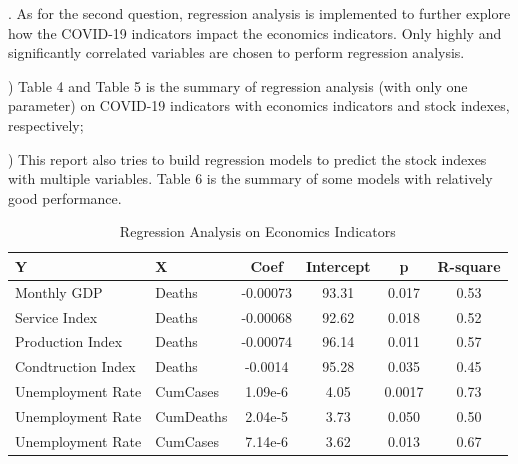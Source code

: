 \documentclass[12pt, a4paper]{report}
\begin{document}
\hspace*{\fill}

. As for the second question, regression analysis is implemented to further explore how the COVID-19 indicators impact 
the economics indicators. Only highly and significantly correlated variables are chosen to perform regression analysis.\par
{}) Table 4 and Table 5 is the summary of regression analysis (with only one parameter) on COVID-19 indicators with economics indicators 
and stock indexes, respectively;\par
{}) This report also tries to build regression models to predict the stock indexes with multiple variables. 
Table 6 is the summary of some models with relatively good performance. 

\begin{table}[H]
    \begin{center}
    \caption{Regression Analysis on Economics Indicators}
    \begin{tabular}{llcccc}
        \toprule
        Y&X&Coef&Intercept&p&R-square\\
        \midrule
        Monthly GDP&Deaths&-0.00073&93.31&0.017&0.53\\
        Service Index&Deaths&-0.00068&92.62&0.018&0.52\\
        Production Index&Deaths&-0.00074&96.14&0.011&0.57\\
        Condtruction Index&Deaths&-0.0014&95.28&0.035&0.45\\
        Unemployment Rate&CumCases&1.09e-6&4.05&0.0017&0.73\\
        Unemployment Rate&CumDeaths&2.04e-5&3.73&0.050&0.50\\
        Unemployment Rate&CumCases&7.14e-6&3.62&0.013&0.67\\
        \bottomrule
    \end{tabular}
    \end{center}
\end{table}
\end{document}
